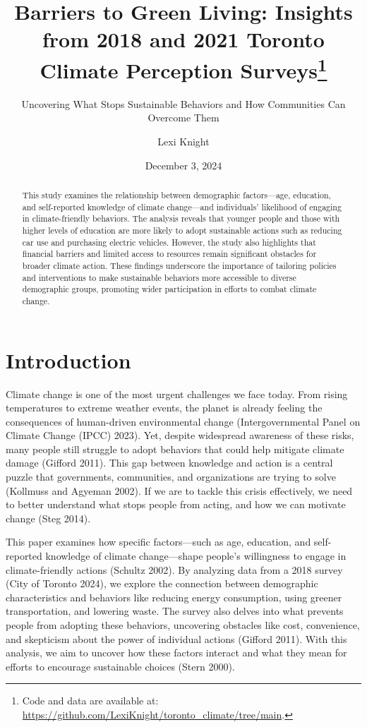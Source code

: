 \documentclass[
  letterpaper,
  DIV=11,
  numbers=noendperiod]{scrartcl}
\title{Barriers to Green Living: Insights from 2018 and 2021 Toronto
Climate Perception Surveys\thanks{Code and data are available at:
\url{https://github.com/LexiKnight/toronto_climate/tree/main}.}}
\subtitle{Uncovering What Stops Sustainable Behaviors and How
Communities Can Overcome Them}
\author{Lexi Knight}
\date{December 3, 2024}
\renewcommand*\contentsname{Table of contents}
\newcommand\contentsname{Table of contents}
\begin{document}
\maketitle
\begin{abstract}
This study examines the relationship between demographic factors---age,
education, and self-reported knowledge of climate change---and
individuals' likelihood of engaging in climate-friendly behaviors. The
analysis reveals that younger people and those with higher levels of
education are more likely to adopt sustainable actions such as reducing
car use and purchasing electric vehicles. However, the study also
highlights that financial barriers and limited access to resources
remain significant obstacles for broader climate action. These findings
underscore the importance of tailoring policies and interventions to
make sustainable behaviors more accessible to diverse demographic
groups, promoting wider participation in efforts to combat climate
change.
\end{abstract}

\renewcommand*\contentsname{Table of contents}
{
\hypersetup{linkcolor=}
\setcounter{tocdepth}{3}
\tableofcontents
}
\section{Introduction}\label{introduction}

Climate change is one of the most urgent challenges we face today. From
rising temperatures to extreme weather events, the planet is already
feeling the consequences of human-driven environmental change
(Intergovernmental Panel on Climate Change (IPCC) 2023). Yet, despite
widespread awareness of these risks, many people still struggle to adopt
behaviors that could help mitigate climate damage (Gifford 2011). This
gap between knowledge and action is a central puzzle that governments,
communities, and organizations are trying to solve (Kollmuss and Agyeman
2002). If we are to tackle this crisis effectively, we need to better
understand what stops people from acting, and how we can motivate change
(Steg 2014).

This paper examines how specific factors---such as age, education, and
self-reported knowledge of climate change---shape people's willingness
to engage in climate-friendly actions (Schultz 2002). By analyzing data
from a 2018 survey (City of Toronto 2024), we explore the connection
between demographic characteristics and behaviors like reducing energy
consumption, using greener transportation, and lowering waste. The
survey also delves into what prevents people from adopting these
behaviors, uncovering obstacles like cost, convenience, and skepticism
about the power of individual actions (Gifford 2011). With this
analysis, we aim to uncover how these factors interact and what they
mean for efforts to encourage sustainable choices (Stern 2000).
\end{document}
